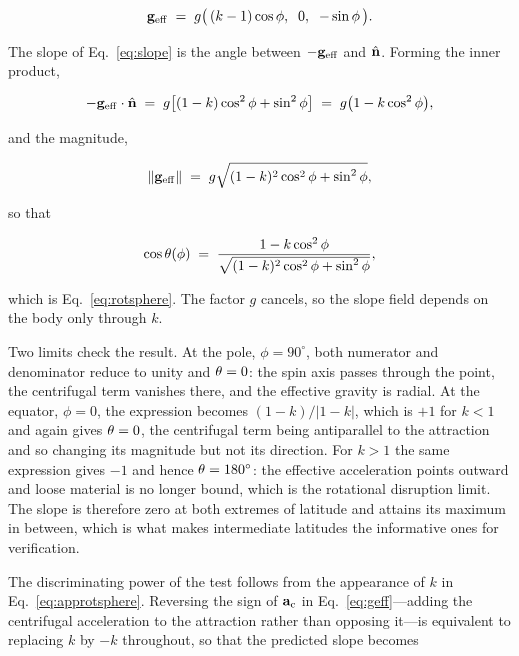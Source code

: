 \begin{equation}
\mathbf{g}_{\mathrm{eff}} \;=\; g\bigl(\,(k-1)\cos\phi,\;\;0,\;\;-\sin\phi\,\bigr).
\label{eq:appgeff}
\end{equation}

The slope of Eq.~\eqref{eq:slope} is the angle between $-\mathbf{g}_{\mathrm{eff}}$ and $\hat{\mathbf{n}}$.
Forming the inner product,

\begin{equation}
-\mathbf{g}_{\mathrm{eff}}\cdot\hat{\mathbf{n}}
\;=\; g\bigl[(1-k)\cos^{2}\phi + \sin^{2}\phi\bigr]
\;=\; g\bigl(1 - k\cos^{2}\phi\bigr),
\label{eq:appdot}
\end{equation}

and the magnitude,

\begin{equation}
\lVert\mathbf{g}_{\mathrm{eff}}\rVert \;=\; g\sqrt{(1-k)^{2}\cos^{2}\phi + \sin^{2}\phi},
\label{eq:appmag}
\end{equation}

so that

\begin{equation}
\cos\theta(\phi) \;=\;
\frac{1-k\cos^{2}\phi}
     {\sqrt{(1-k)^{2}\cos^{2}\phi + \sin^{2}\phi}},
\label{eq:approtsphere}
\end{equation}

which is Eq.~\eqref{eq:rotsphere}. The factor $g$ cancels, so the slope field
depends on the body only through $k$.

Two limits check the result. At the pole, $\phi = 90^{\circ}$, both numerator
and denominator reduce to unity and $\theta = 0$: the spin axis passes through
the point, the centrifugal term vanishes there, and the effective gravity is
radial. At the equator, $\phi = 0$, the expression becomes $(1-k)/\lvert
1-k\rvert$, which is $+1$ for $k<1$ and again gives $\theta = 0$, the
centrifugal term being antiparallel to the attraction and so changing its
magnitude but not its direction. For $k>1$ the same expression gives $-1$ and
hence $\theta = 180^{\circ}$: the effective acceleration points outward and
loose material is no longer bound, which is the rotational disruption limit. The
slope is therefore zero at both extremes of latitude and attains its maximum in
between, which is what makes intermediate latitudes the informative ones for
verification.

The discriminating power of the test follows from the appearance of $k$ in
Eq.~\eqref{eq:approtsphere}. Reversing the sign of $\mathbf{a}_{\mathrm{c}}$ in
Eq.~\eqref{eq:geff}---adding the centrifugal acceleration to the attraction
rather than opposing it---is equivalent to replacing $k$ by $-k$ throughout, so
that the predicted slope becomes

